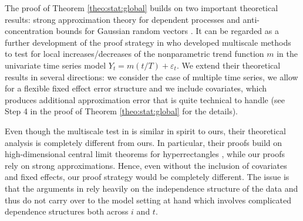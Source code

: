 \documentclass[12pt]{article}
\begin{document}
\begin{remark}\label{remark:general-theo-1}
The proof of Theorem \ref{theo:stat:global} builds on two important theoretical results: strong approximation theory for dependent processes \citep{BerkesLiuWu2014} and anti-concentration bounds for Gaussian random vectors \citep{Nazarov2003}. It can be regarded as a further development of the proof strategy in \cite{KhismatullinaVogt2020} who developed multiscale methods to test for local increases/decreases of the nonparametric trend function $m$ in the univariate time series model $Y_t = m(t/T) + \varepsilon_t$. We extend their theoretical results in several directions: we consider the case of multiple time series, we allow for a  flexible fixed effect error structure and we include covariates, which produces additional approximation error that is quite technical to handle (see Step 4 in the proof of Theorem \ref{theo:stat:global} for the details). 
\end{remark}


\begin{remark}\label{remark:general-theo-2}
Even though the multiscale test in \cite{KhismatullinaVogt2023} is similar in spirit to ours, their theoretical analysis is completely different from ours. In particular, their proofs build on high-dimensional central limit theorems for hyperrectangles \citep{Chernozhukov2017}, while our proofs rely on strong approximations. Hence, even without the inclusion of covariates and fixed effects, our proof strategy would be completely different. The issue is that the arguments in \cite{KhismatullinaVogt2023} rely heavily on the independence structure of the data and thus do not carry over to the model setting at hand which involves complicated dependence structures both across $i$ and $t$.
\end{remark}
\end{document}

